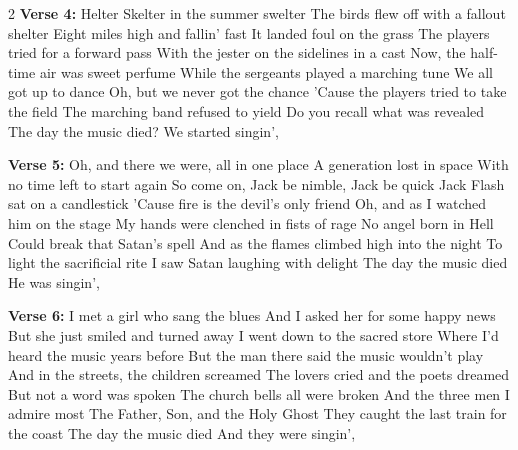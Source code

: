 \documentclass[../../../../songbookMain]{subfiles}
\begin{document}
\begin{guitar}
\begin{multicols}{2}
\textbf{Verse 4:}
Helter Skelter in the summer swelter
The birds flew off with a fallout shelter
Eight miles high and fallin' fast
It landed foul on the grass
The players tried for a forward pass
With the jester on the sidelines in a cast
Now, the half-time air was sweet perfume
While the sergeants played a marching tune
We all got up to dance
Oh, but we never got the chance
'Cause the players tried to take the field
The marching band refused to yield
Do you recall what was revealed
The day the music died?
We started singin',

\textbf{Verse 5:}
Oh, and there we were, all in one place
A generation lost in space
With no time left to start again
So come on, Jack be nimble, Jack be quick
Jack Flash sat on a candlestick
'Cause fire is the devil's only friend
Oh, and as I watched him on the stage
My hands were clenched in fists of rage
No angel born in Hell
Could break that Satan's spell
And as the flames climbed high into the night
To light the sacrificial rite
I saw Satan laughing with delight
The day the music died
He was singin',

\textbf{Verse 6:}
I met a girl who sang the blues
And I asked her for some happy news
But she just smiled and turned away
I went down to the sacred store
Where I'd heard the music years before
But the man there said the music wouldn't play
And in the streets, the children screamed
The lovers cried and the poets dreamed
But not a word was spoken
The church bells all were broken
And the three men I admire most
The Father, Son, and the Holy Ghost
They caught the last train for the coast
The day the music died
And they were singin',

\end{multicols}

\end{guitar}
\end{document}
